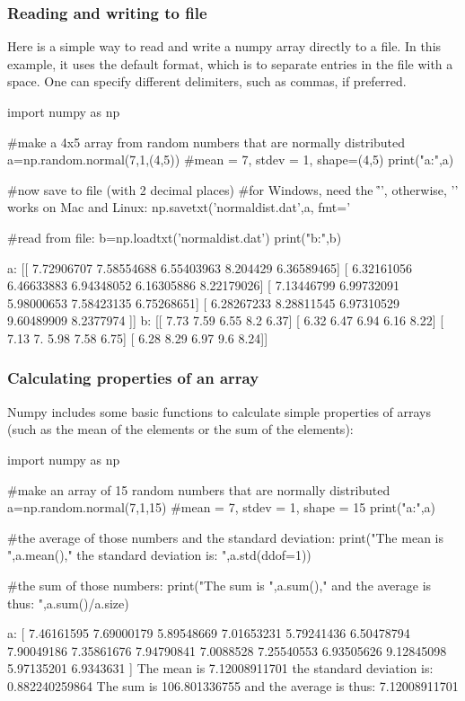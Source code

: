 \subsubsection{Reading and writing to file}
Here is a simple way to read and write a numpy array directly to a file. In this example, it uses the default format, which is to separate entries in the file with a space. One can specify different delimiters, such as commas, if preferred.
\begin{python}[caption = Reading and writing numpy arrays from/to a file]
import numpy as np

#make a 4x5 array from random numbers that are normally distributed
a=np.random.normal(7,1,(4,5)) #mean = 7, stdev = 1, shape=(4,5)
print("a:\n",a)

#now save to file (with 2 decimal places)
#for Windows, need the '\r\n', otherwise, '\n' works on Mac and Linux:
np.savetxt('normaldist.dat',a, fmt='%

#read from file:
b=np.loadtxt('normaldist.dat')
print("b:\n",b)
\end{python} 
\begin{poutput}
a:
 [[ 7.72906707  7.58554688  6.55403963  8.204429    6.36589465]
 [ 6.32161056  6.46633883  6.94348052  6.16305886  8.22179026]
 [ 7.13446799  6.99732091  5.98000653  7.58423135  6.75268651]
 [ 6.28267233  8.28811545  6.97310529  9.60489909  8.2377974 ]]
b:
 [[ 7.73  7.59  6.55  8.2   6.37]
 [ 6.32  6.47  6.94  6.16  8.22]
 [ 7.13  7.    5.98  7.58  6.75]
 [ 6.28  8.29  6.97  9.6   8.24]]
\end{poutput}

\subsubsection{Calculating properties of an array}
Numpy includes some basic functions to calculate simple properties of arrays (such as the mean of the elements or the sum of the elements):
\begin{python}[caption = Numpy for statistical properties of an array of values.]
import numpy as np

#make an array of 15 random numbers that are normally distributed
a=np.random.normal(7,1,15) #mean = 7, stdev = 1, shape = 15
print("a:\n",a)

#the average of those numbers and the standard deviation:
print("The mean is ",a.mean()," the standard deviation is: ",a.std(ddof=1))

#the sum of those numbers:
print("The sum is ",a.sum()," and the average is thus: ",a.sum()/a.size)
\end{python} 
\begin{poutput}
a:
 [ 7.46161595  7.69000179  5.89548669  7.01653231  5.79241436  6.50478794
  7.90049186  7.35861676  7.94790841  7.0088528   7.25540553  6.93505626
  9.12845098  5.97135201  6.9343631 ]
The mean is  7.12008911701  the standard deviation is:  0.882240259864
The sum is  106.801336755  and the average is thus:  7.12008911701
\end{poutput}

